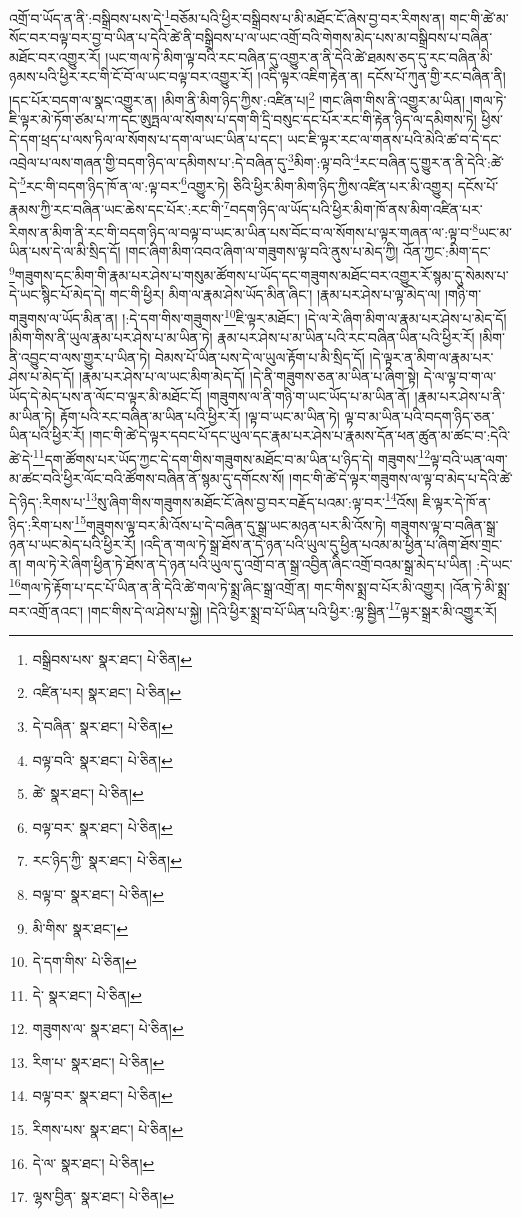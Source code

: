 འགྲོ་བ་ཡོད་ན་ནི་:བསྒྲིབས་པས་དེ་\footnote{བསྒྲིབས་པས་  སྣར་ཐང་།  པེ་ཅིན། }བཅོམ་པའི་ཕྱིར་བསྒྲིབས་པ་མི་མཐོང་ངོ་ཞེས་བྱ་བར་རིགས་ན། གང་གི་ཚེ་མ་སོང་བར་བལྟ་བར་བྱ་བ་ཡིན་པ་དེའི་ཚེ་ནི་བསྒྲིབས་པ་ལ་ཡང་འགྲོ་བའི་གེགས་མེད་པས་མ་བསྒྲིབས་པ་བཞིན་མཐོང་བར་འགྱུར་རོ། །ཡང་གལ་ཏེ་མིག་ལྟ་བའི་རང་བཞིན་དུ་འགྱུར་ན་ནི་དེའི་ཚེ་ཐམས་ཅད་དུ་རང་བཞིན་མི་ཉམས་པའི་ཕྱིར་རང་གི་ངོ་བོ་ལ་ཡང་བལྟ་བར་འགྱུར་རོ། །འདི་ལྟར་འཇིག་རྟེན་ན། དངོས་པོ་ཀུན་གྱི་རང་བཞིན་ནི། །དང་པོར་བདག་ལ་སྣང་འགྱུར་ན། །མིག་ནི་མིག་ཉིད་ཀྱིས་:འཛིན་པ།\footnote{འཛིན་པར།  སྣར་ཐང་།  པེ་ཅིན། } །གང་ཞིག་གིས་ནི་འགྱུར་མ་ཡིན། །གལ་ཏེ་ཇི་ལྟར་མེ་ཏོག་ཙམ་པ་ཀ་དང་ཨུཏྤལ་ལ་སོགས་པ་དག་གི་དྲི་བསུང་དང་པོར་རང་གི་རྟེན་ཉིད་ལ་དམིགས་ཏེ། ཕྱིས་དེ་དག་ཕྲད་པ་ལས་ཏིལ་ལ་སོགས་པ་དག་ལ་ཡང་ཡིན་པ་དང་། ཡང་ཇི་ལྟར་རང་ལ་གནས་པའི་མེའི་ཚ་བ་དེ་དང་འབྲེལ་པ་ལས་གཞན་གྱི་བདག་ཉིད་ལ་དམིགས་པ་:དེ་བཞིན་དུ་\footnote{དེ་བཞིན་  སྣར་ཐང་།  པེ་ཅིན། }མིག་:ལྟ་བའི་\footnote{བལྟ་བའི་  སྣར་ཐང་།  པེ་ཅིན། }རང་བཞིན་དུ་གྱུར་ན་ནི་དེའི་:ཚེ་དེ་\footnote{ཚེ་  སྣར་ཐང་།  པེ་ཅིན། }རང་གི་བདག་ཉིད་ཁོ་ན་ལ་:ལྟ་བར་\footnote{བལྟ་བར་  སྣར་ཐང་།  པེ་ཅིན། }འགྱུར་ཏེ། ཅིའི་ཕྱིར་མིག་མིག་ཉིད་ཀྱིས་འཛིན་པར་མི་འགྱུར། དངོས་པོ་རྣམས་ཀྱི་རང་བཞིན་ཡང་ཆེས་དང་པོར་:རང་གི་\footnote{རང་ཉིད་ཀྱི་  སྣར་ཐང་།  པེ་ཅིན། }བདག་ཉིད་ལ་ཡོད་པའི་ཕྱིར་མིག་ཁོ་ནས་མིག་འཛིན་པར་རིགས་ན་མིག་ནི་རང་གི་བདག་ཉིད་ལ་བལྟ་བ་ཡང་མ་ཡིན་པས་བོང་བ་ལ་སོགས་པ་ལྟར་གཞན་ལ་:ལྟ་བ་\footnote{བལྟ་བ་  སྣར་ཐང་།  པེ་ཅིན། }ཡང་མ་ཡིན་པས་དེ་ལ་མི་སྲིད་དོ། །གང་ཞིག་མིག་འབའ་ཞིག་ལ་གཟུགས་ལྟ་བའི་ནུས་པ་མེད་ཀྱི། འོན་ཀྱང་:མིག་དང་\footnote{མི་གིས་  སྣར་ཐང་། }གཟུགས་དང་མིག་གི་རྣམ་པར་ཤེས་པ་གསུམ་ཚོགས་པ་ཡོད་དང་གཟུགས་མཐོང་བར་འགྱུར་རོ་སྙམ་དུ་སེམས་པ་དེ་ཡང་སྙིང་པོ་མེད་དེ། གང་གི་ཕྱིར། མིག་ལ་རྣམ་ཤེས་ཡོད་མིན་ཞིང་། །རྣམ་པར་ཤེས་པ་ལྟ་མེད་ལ། །གཉི་ག་གཟུགས་ལ་ཡོད་མིན་ན། །:དེ་དག་གིས་གཟུགས་\footnote{དེ་དག་གིས་  པེ་ཅིན། }ཇི་ལྟར་མཐོང་། །དེ་ལ་རེ་ཞིག་མིག་ལ་རྣམ་པར་ཤེས་པ་མེད་དོ། །མིག་གིས་ནི་ཡུལ་རྣམ་པར་ཤེས་པ་མ་ཡིན་ཏེ། རྣམ་པར་ཤེས་པ་མ་ཡིན་པའི་རང་བཞིན་ཡིན་པའི་ཕྱིར་རོ། །མིག་ནི་འབྱུང་བ་ལས་གྱུར་པ་ཡིན་ཏེ། བེམས་པོ་ཡིན་པས་དེ་ལ་ཡུལ་རྟོག་པ་མི་སྲིད་དོ། །དེ་ལྟར་ན་མིག་ལ་རྣམ་པར་ཤེས་པ་མེད་དོ། །རྣམ་པར་ཤེས་པ་ལ་ཡང་མིག་མེད་དོ། །དེ་ནི་གཟུགས་ཅན་མ་ཡིན་པ་ཞིག་སྟེ། དེ་ལ་ལྟ་བ་ག་ལ་ཡོད་དེ་མེད་པས་ན་ལོང་བ་ལྟར་མི་མཐོང་ངོ། །གཟུགས་ལ་ནི་གཉི་ག་ཡང་ཡོད་པ་མ་ཡིན་ནོ། །རྣམ་པར་ཤེས་པ་ནི་མ་ཡིན་ཏེ། རྟོག་པའི་རང་བཞིན་མ་ཡིན་པའི་ཕྱིར་རོ། །ལྟ་བ་ཡང་མ་ཡིན་ཏེ། ལྟ་བ་མ་ཡིན་པའི་བདག་ཉིད་ཅན་ཡིན་པའི་ཕྱིར་རོ། །གང་གི་ཚེ་དེ་ལྟར་དབང་པོ་དང་ཡུལ་དང་རྣམ་པར་ཤེས་པ་རྣམས་དོན་ཕན་ཚུན་མ་ཚང་བ་:དེའི་ཚེ་དེ་\footnote{དེ་  སྣར་ཐང་།  པེ་ཅིན། }དག་ཚོགས་པར་ཡོད་ཀྱང་དེ་དག་གིས་གཟུགས་མཐོང་བ་མ་ཡིན་པ་ཉིད་དེ། གཟུགས་\footnote{གཟུགས་ལ་  སྣར་ཐང་།  པེ་ཅིན། }ལྟ་བའི་ཡན་ལག་མ་ཚང་བའི་ཕྱིར་ལོང་བའི་ཚོགས་བཞིན་ནོ་སྙམ་དུ་དགོངས་སོ། །གང་གི་ཚེ་དེ་ལྟར་གཟུགས་ལ་ལྟ་བ་མེད་པ་དེའི་ཚེ་དེ་ཉིད་:རིགས་པ་\footnote{རིག་པ་  སྣར་ཐང་།  པེ་ཅིན། }སུ་ཞིག་གིས་གཟུགས་མཐོང་ངོ་ཞེས་བྱ་བར་བརྗོད་པའམ་:ལྟ་བར་\footnote{བལྟ་བར་  སྣར་ཐང་།  པེ་ཅིན། }འོས། ཇི་ལྟར་དེ་ཁོ་ན་ཉིད་:རིག་པས་\footnote{རིགས་པས་  སྣར་ཐང་།  པེ་ཅིན། }གཟུགས་ལྟ་བར་མི་འོས་པ་དེ་བཞིན་དུ་སྒྲ་ཡང་མཉན་པར་མི་འོས་ཏེ། གཟུགས་ལྟ་བ་བཞིན་སྒྲ་ཉན་པ་ཡང་མེད་པའི་ཕྱིར་རོ། །འདི་ན་གལ་ཏེ་སྒྲ་ཐོས་ན་དེ་ཉན་པའི་ཡུལ་དུ་ཕྱིན་པའམ་མ་ཕྱིན་པ་ཞིག་ཐོས་གྲང་ན། གལ་ཏེ་རེ་ཞིག་ཕྱིན་ཏེ་ཐོས་ན་དེ་ཉན་པའི་ཡུལ་དུ་འགྲོ་བ་ན་སྒྲ་འབྱིན་ཞིང་འགྲོ་བའམ་སྒྲ་མེད་པ་ཡིན། :དེ་ཡང་\footnote{དེ་ལ་  སྣར་ཐང་།  པེ་ཅིན། }གལ་ཏེ་རྟོག་པ་དང་པོ་ཡིན་ན་ནི་དེའི་ཚེ་གལ་ཏེ་སྨྲ་ཞིང་སྒྲ་འགྲོ་ན། གང་གིས་སྨྲ་བ་པོར་མི་འགྱུར། །འོན་ཏེ་མི་སྨྲ་བར་འགྲོ་ནའང་། །གང་གིས་དེ་ལ་ཤེས་པ་སྐྱེ། །དེའི་ཕྱིར་སྨྲ་བ་པོ་ཡིན་པའི་ཕྱིར་:ལྷ་སྦྱིན་\footnote{ལྷས་བྱིན་  སྣར་ཐང་།  པེ་ཅིན། }ལྟར་སྒྲར་མི་འགྱུར་རོ། 